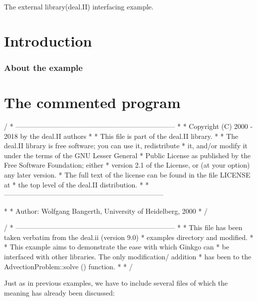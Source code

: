 The external library(deal.\+II) interfacing example.

 \label{_Intro}%
 \label{_Introduction}%
\section*{Introduction}

\label{_Abouttheexample}%
\subsubsection*{About the example }

\label{_CommProg}%
 \section*{The commented program}


\begin{DoxyCode}
/ * ---------------------------------------------------------------------
 *
 * Copyright (C) 2000 - 2018 by the deal.II authors
 *
 * This file is part of the deal.II library.
 *
 * The deal.II library is free software; you can use it, redistribute
 * it, and/or modify it under the terms of the GNU Lesser General
 * Public License as published by the Free Software Foundation; either
 * version 2.1 of the License, or (at your option) any later version.
 * The full text of the license can be found in the file LICENSE at
 * the top level of the deal.II distribution.
 *
 * ---------------------------------------------------------------------

 *
 * Author: Wolfgang Bangerth, University of Heidelberg, 2000
 * /

/ * ---------------------------------------------------------------------
 *
 * This file has been taken verbatim from the deal.ii (version 9.0)
 * examples directory and modified.
 *
 * This example aims to demonstrate the ease with which Ginkgo can
 * be interfaced with other libraries. The only modification/ addition
 * has been to the AdvectionProblem::solve () function.
 *
 * /
\end{DoxyCode}


Just as in previous examples, we have to include several files of which the meaning has already been discussed\+:


